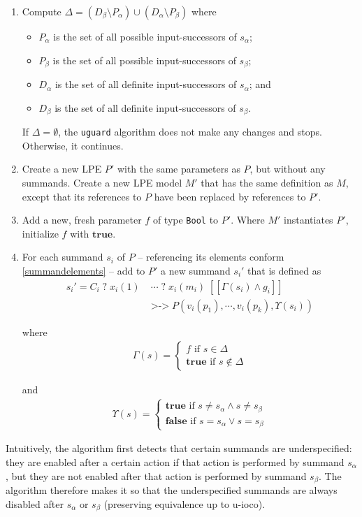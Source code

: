\begin{enumerate}
\item Compute $\Delta = (D_\beta \setminus P_\alpha) \cup (D_\alpha \setminus P_\beta)$ where
\begin{itemize}
\item $P_\alpha$ is the set of all possible input-successors of $s_\alpha$;
\item $P_\beta$ is the set of all possible input-successors of $s_\beta$;
\item $D_\alpha$ is the set of all definite input-successors of $s_\alpha$; and
\item $D_\beta$ is the set of all definite input-successors of $s_\beta$.
\end{itemize}

If $\Delta = \emptyset{}$, the \texttt{uguard} algorithm does not make any changes and stops.
Otherwise, it continues.

\item Create a new LPE $P'$ with the same parameters as $P$, but without any summands.
Create a new LPE model $M'$ that has the same definition as $M$, except that its references to $P$ have been replaced by references to $P'$.

\item Add a new, fresh parameter $f$ of type \texttt{Bool} to $P'$.
Where $M'$ instantiates $P'$, initialize $f$ with $\textbf{true}$.

\item For each summand $s_i$ of $P$ -- referencing its elements conform \ref{summandelements} -- add to $P'$ a new summand ${s_i}'$ that is defined as
\begin{align*}
{s_i}' = C_i \; \texttt{?} \; x_i(1) \; &\cdots{} \; \texttt{?} \; x_i(m_i) \; [[\Gamma(s_i) \land g_i]] \\
&\texttt{>->} \; P(v_i(p_1), \cdots{}, v_i(p_k), \Upsilon(s_i))
\end{align*}

where
\begin{align*}
\Gamma(s) = \begin{cases}
f \text{ if } s \in \Delta \\
\textbf{true} \text{ if } s \notin \Delta
\end{cases}
\end{align*}

and
\begin{align*}
\Upsilon(s) = \begin{cases}
\textbf{true} \text{ if } s \neq s_\alpha \land s \neq s_\beta \\
\textbf{false} \text{ if } s = s_\alpha \lor s = s_\beta
\end{cases}
\end{align*}
\end{enumerate}

Intuitively, the algorithm first detects that certain summands are underspecified: they are enabled after a certain action if that action is performed by summand $s_\alpha$, but they are not enabled after that action is performed by summand $s_\beta$.
The algorithm therefore makes it so that the underspecified summands are always disabled after $s_\alpha$ or $s_\beta$ (preserving equivalence up to u-ioco).

